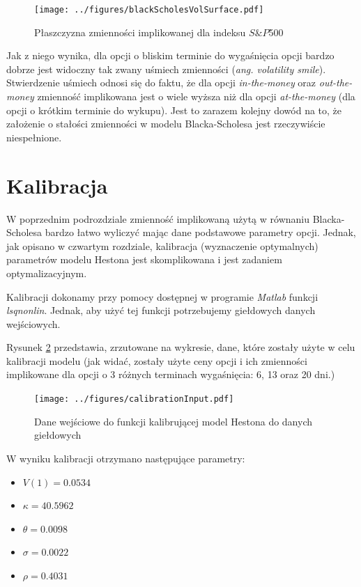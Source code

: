 \documentclass{pracamgr}
\begin{document}
{\begin{figure}
  \centering
  \texttt{[image: ../figures/blackScholesVolSurface.pdf]}
  \caption{Płaszczyzna zmienności implikowanej dla indeksu $S\&P$500}
  \label{fig:volatilitySurface}
\end{figure}

Jak z niego wynika, dla opcji o bliskim terminie do wygaśnięcia opcji bardzo dobrze jest widoczny
tak zwany uśmiech zmienności (\textit{ang. volatility smile}). Stwierdzenie uśmiech 
odnosi się do faktu, że dla opcji \textit{in-the-money} oraz \textit{out-the-money}
zmienność implikowana jest o wiele wyższa niż dla opcji \textit{at-the-money} (dla opcji o krótkim
terminie do wykupu).
Jest to zarazem kolejny dowód na to, że założenie o stałości zmienności w modelu Blacka-Scholesa jest rzeczywiście niespełnione.


\section{Kalibracja}

W poprzednim podrozdziale zmienność implikowaną użytą w równaniu Blacka-Scholesa bardzo łatwo 
wyliczyć mając dane podstawowe parametry opcji. Jednak, jak opisano w czwartym rozdziale, 
kalibracja (wyznaczenie optymalnych) parametrów modelu Hestona jest skomplikowana i jest
zadaniem optymalizacyjnym.  

Kalibracji dokonamy przy pomocy dostępnej w programie \textit{Matlab} funkcji \textit{lsqnonlin}.
Jednak, aby użyć tej funkcji potrzebujemy giełdowych danych wejściowych.


Rysunek \ref{fig:calibration} przedstawia, zrzutowane na wykresie, dane, które
zostały użyte w celu kalibracji modelu (jak widać, zostały użyte ceny 
opcji i ich zmienności implikowane dla opcji o 3 różnych terminach wygaśnięcia: 
6, 13 oraz 20 dni.)

\begin{figure}
  \centering
  \texttt{[image: ../figures/calibrationInput.pdf]}
  \caption{Dane wejściowe do funkcji kalibrującej model Hestona do danych giełdowych}
  \label{fig:calibration}
\end{figure}

W wyniku kalibracji otrzymano następujące parametry:


\begin{itemize}
  \item $V(1) = 0.0534 $
  \item $\kappa = 40.5962$
  \item $\theta = 0.0098$
  \item $\sigma = 0.0022$
  \item $\rho = 0.4031$
\end{itemize}


}
\end{document}
